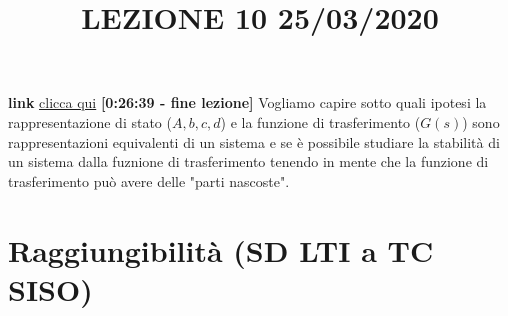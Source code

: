 \newpage
\title{LEZIONE 10 25/03/2020}\newline
\textbf{link} \href{https://web.microsoftstream.com/video/562a82e0-19cc-4f81-9183-eee77c9c45a4?list=user&userId=faa91214-a6f5-40d7-8875-253fd49b8ce1}{clicca qui} \;\;\textbf{[0:26:39 - fine lezione]}\newline
\newline
Vogliamo capire sotto quali ipotesi la rappresentazione di stato ($A, b, c, d$) e la funzione di trasferimento ($G(s)$) sono rappresentazioni equivalenti di un sistema e se è possibile studiare la stabilità di un sistema dalla fuznione di trasferimento tenendo in mente che la funzione di trasferimento può avere delle "parti nascoste".
\section{Raggiungibilità (SD LTI a TC SISO)}